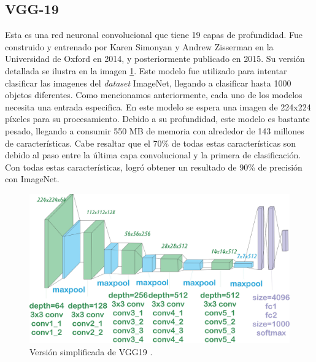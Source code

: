 \subsection{VGG-19}
Esta es una red neuronal convolucional que tiene 19 capas de profundidad. Fue construido y entrenado por Karen Simonyan y Andrew Zisserman\cite{Simonyan2015} en la Universidad de Oxford en 2014, y posteriormente publicado en 2015. Su versión detallada se ilustra en la imagen \ref{VGG19}. Este modelo fue utilizado para intentar clasificar las imagenes del \textit{dataset} ImageNet, llegando a clasificar hasta 1000 objetos diferentes. Como mencionamos anteriormente, cada uno de los modelos necesita una entrada especifica. En este modelo se espera una imagen de 224x224 píxeles para su procesamiento. Debido a su profundidad, este modelo es bastante pesado, llegando a consumir 550 MB de memoria con alrededor de 143 millones de características. Cabe resaltar que el 70\% de todas estas características son debido al paso entre la última capa convolucional y la primera de clasificación. Con todas estas características, logró obtener un resultado de 90\% de precisión con ImageNet.

\begin{figure}[h!]
\includegraphics[width=1\textwidth]{images/VGG19.jpeg}
\centering
\caption{Versión simplificada de VGG19 \protect\cite{modelos}. }
\label{VGG19}
\end{figure}

